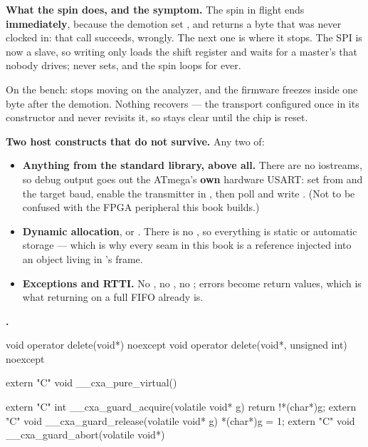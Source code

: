 \textbf{What the spin does, and the symptom.} The spin in flight ends \textbf{immediately}, because
the demotion set , and  returns a byte that was never clocked in: that
call succeeds, wrongly. The next one is where it stops. The SPI is now a slave, so writing
 only loads the shift register and waits for a master's  that nobody drives;
 never sets, and the spin loops for ever.

On the bench:  stops moving on the analyzer, and the firmware freezes inside
 one byte after the demotion. Nothing recovers --- the transport configured
 once in its constructor and never revisits it, so  stays clear until the chip
is reset. 

\textbf{Two host constructs that do not survive.} Any two of:
\begin{itemize}
  \item \textbf{Anything from the standard library,  above all.} There are no
    iostreams, so debug output goes out the ATmega's \textbf{own} hardware USART: set 
    from  and the target baud, enable the transmitter in , then poll
     and write . (Not to be confused with the FPGA
    peripheral this book builds.)
  \item \textbf{Dynamic allocation},  or . There is no
    , so everything is static or automatic storage --- which is why every seam in
    this book is a reference injected into an object living in 's frame.
  \item \textbf{Exceptions and RTTI.} No , no , no ;
    errors become return values, which is what  returning  on a full FIFO
    already is.
\end{itemize}

\textbf{.}

\begin{cppcode}
void operator delete(void*) noexcept {}
void operator delete(void*, unsigned int) noexcept {}

extern "C" void __cxa_pure_virtual() {}

extern "C" int  __cxa_guard_acquire(volatile void* g) { return !*(char*)g; }
extern "C" void __cxa_guard_release(volatile void* g) { *(char*)g = 1; }
extern "C" void __cxa_guard_abort(volatile void*) {}
\end{cppcode}

